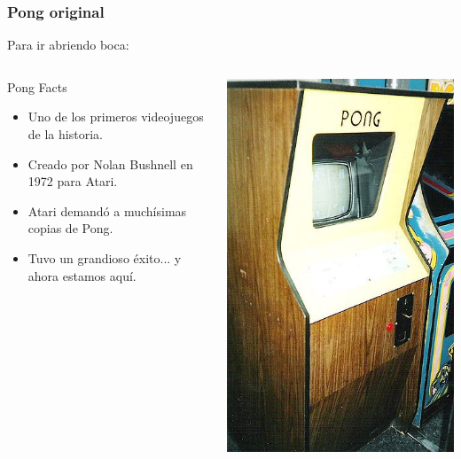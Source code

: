\begin{frame}
	\frametitle{Pong original}
	
	Para ir abriendo boca:
	
	\begin{columns}[c]
	\column{175pt}
		
	\begin{block}{Pong Facts}
		\begin{itemize}
            \item Uno de los primeros videojuegos de la historia.
			\item Creado por Nolan Bushnell en 1972 para Atari.
            \item Atari demandó a muchísimas copias de Pong.
            \item Tuvo un grandioso éxito... y ahora estamos aquí.
		\end{itemize}            
	\end{block}
	
	\column{125pt}
	
	\begin{center}
		\includegraphics[scale=0.3]{img/pong-recreativa.jpg}
	\end{center}	
	
	\end{columns}
	
\end{frame}

